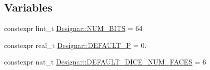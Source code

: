 \subsection*{Variables}
\begin{DoxyCompactItemize}
\item 
constexpr lint\+\_\+t \hyperlink{namespace_designar_abb77bd8c0a61847409c6dcb779b66974}{Designar\+::\+N\+U\+M\+\_\+\+B\+I\+TS} = 64
\item 
constexpr real\+\_\+t \hyperlink{namespace_designar_a2b9b8e0588e8d75548e74bd590e6f9e5}{Designar\+::\+D\+E\+F\+A\+U\+L\+T\+\_\+P} = 0.
\item 
constexpr nat\+\_\+t \hyperlink{namespace_designar_af614c8a444ce943532075892ad401662}{Designar\+::\+D\+E\+F\+A\+U\+L\+T\+\_\+\+D\+I\+C\+E\+\_\+\+N\+U\+M\+\_\+\+F\+A\+C\+ES} = 6
\end{DoxyCompactItemize}
